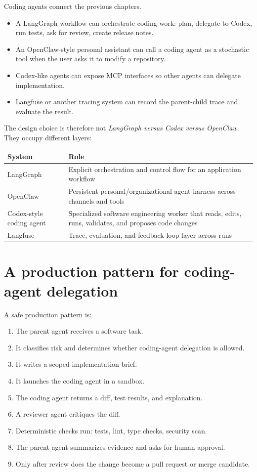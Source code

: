 Coding agents connect the previous chapters.

\begin{itemize}[leftmargin=*]
  \item A LangGraph workflow can orchestrate coding work: plan, delegate to Codex, run tests, ask for review, create release notes.
  \item An OpenClaw-style personal assistant can call a coding agent as a stochastic tool when the user asks it to modify a repository.
  \item Codex-like agents can expose MCP interfaces so other agents can delegate implementation.
  \item Langfuse or another tracing system can record the parent-child trace and evaluate the result.
\end{itemize}

The design choice is therefore not \emph{LangGraph versus Codex versus OpenClaw}. They occupy different layers:

\begin{longtable}{p{}p{}}
\toprule
\textbf{System} & \textbf{Role} \\
\midrule
LangGraph & Explicit orchestration and control flow for an application workflow \\
OpenClaw & Persistent personal/organizational agent harness across channels and tools \\
Codex-style coding agent & Specialized software engineering worker that reads, edits, runs, validates, and proposes code changes \\
Langfuse & Trace, evaluation, and feedback-loop layer across runs \\
\bottomrule
\end{longtable}

\section{A production pattern for coding-agent delegation}

A safe production pattern is:

\begin{enumerate}[leftmargin=*]
  \item The parent agent receives a software task.
  \item It classifies risk and determines whether coding-agent delegation is allowed.
  \item It writes a scoped implementation brief.
  \item It launches the coding agent in a sandbox.
  \item The coding agent returns a diff, test results, and explanation.
  \item A reviewer agent critiques the diff.
  \item Deterministic checks run: tests, lint, type checks, security scan.
  \item The parent agent summarizes evidence and asks for human approval.
  \item Only after review does the change become a pull request or merge candidate.
\end{enumerate}

